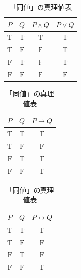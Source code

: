 \begin{table}[htbp]
\begin{minipage}[t]{0.32\linewidth}
\centering
\caption{論理和（積）の真理値表}
\label{tab:論理和（積）の真理値表}
\begin{tabular}{|c|c|c|c|} \hline
  $P$          & $Q$          & $P \land Q$  & $P \lor Q$   \\ \hline
  $\mathrm{T}$ & $\mathrm{T}$ & $\mathrm{T}$ & $\mathrm{T}$ \\ \hline
  $\mathrm{T}$ & $\mathrm{F}$ & $\mathrm{F}$ & $\mathrm{T}$ \\ \hline
  $\mathrm{F}$ & $\mathrm{T}$ & $\mathrm{F}$ & $\mathrm{T}$ \\ \hline
  $\mathrm{F}$ & $\mathrm{F}$ & $\mathrm{F}$ & $\mathrm{F}$ \\ \hline
\end{tabular}
\end{minipage}
\hfill
\begin{minipage}[t]{0.32\linewidth}
\centering
\caption{「含意」の真理値表}
\label{tab:含意の真理値表}
\begin{tabular}{|c|c|c|} \hline
  $P$          & $Q$          & $P \to Q$    \\ \hline
  $\mathrm{T}$ & $\mathrm{T}$ & $\mathrm{T}$ \\ \hline
  $\mathrm{T}$ & $\mathrm{F}$ & $\mathrm{F}$ \\ \hline
  $\mathrm{F}$ & $\mathrm{T}$ & $\mathrm{T}$ \\ \hline
  $\mathrm{F}$ & $\mathrm{F}$ & $\mathrm{T}$ \\ \hline
\end{tabular}
\end{minipage}
\hfill
\begin{minipage}[t]{0.32\linewidth}
\centering
\caption{「同値」の真理値表}
\label{tab:同値の真理値表}
\begin{tabular}{|c|c|c|} \hline
  $P$          & $Q$          & $P \leftrightarrow Q$ \\ \hline
  $\mathrm{T}$ & $\mathrm{T}$ & $\mathrm{T}$          \\ \hline
  $\mathrm{T}$ & $\mathrm{F}$ & $\mathrm{F}$          \\ \hline
  $\mathrm{F}$ & $\mathrm{T}$ & $\mathrm{F}$          \\ \hline
  $\mathrm{F}$ & $\mathrm{F}$ & $\mathrm{T}$          \\ \hline
\end{tabular}
\end{minipage}

\end{table}

